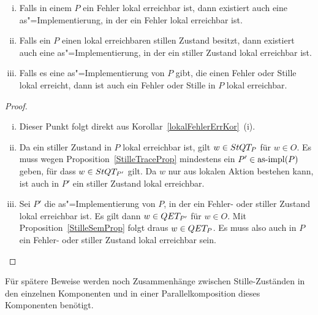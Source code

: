\begin{Kor}\mbox{}
  \label{lokaleStilleErrKor}
  \begin{enumerate}[(i)]
    \item Falls in einem \MEIO{} $P$ ein Fehler lokal erreichbar ist, dann
      existiert auch eine as"=Implementierung, in der ein Fehler lokal
      erreichbar ist.
    \item Falls ein \MEIO{} $P$ einen lokal erreichbaren stillen Zustand
      besitzt, dann existiert auch eine as"=Implementierung, in der ein
      stiller Zustand lokal erreichbar ist.
    \item Falls es eine as"=Implementierung von $P$ gibt, die einen Fehler oder
      Stille lokal erreicht, dann ist auch ein Fehler oder Stille in $P$ lokal
      erreichbar.
  \end{enumerate}
\end{Kor}
\begin{proof}\mbox{}
  \begin{enumerate}[(i)]
    \item Dieser Punkt folgt direkt aus Korollar~\ref{lokalFehlerErrKor}~(i).
    \item Da ein stiller Zustand in $P$ lokal erreichbar ist, gilt $w\in StQT
      _P$ für $w\in O$. Es muss wegen Proposition~\ref{StilleTraceProp}
      mindestens ein $P'\in \mathrm{as}\text{-}\mathrm{impl} (P)$ geben, für dass $w\in StQT _{P'}$
      gilt. Da $w$ nur aus lokalen Aktion bestehen kann, ist auch in $P'$ ein
      stiller Zustand lokal erreichbar.
    \item Sei $P'$ die as"=Implementierung von $P$, in der ein Fehler- oder
      stiller Zustand lokal erreichbar ist. Es gilt dann $w\in QET _{P'}$ für
      $w\in O$. Mit Proposition~\ref{StilleSemProp} folgt draus $w\in QET _P$.
      Es muss also auch in $P$ ein Fehler- oder stiller Zustand lokal
      erreichbar sein.
  \end{enumerate}
\end{proof}

Für spätere Beweise werden noch Zusammenhänge zwischen Stille-Zuständen in den
einzelnen Komponenten und in einer Parallelkomposition dieses Komponenten
benötigt.

